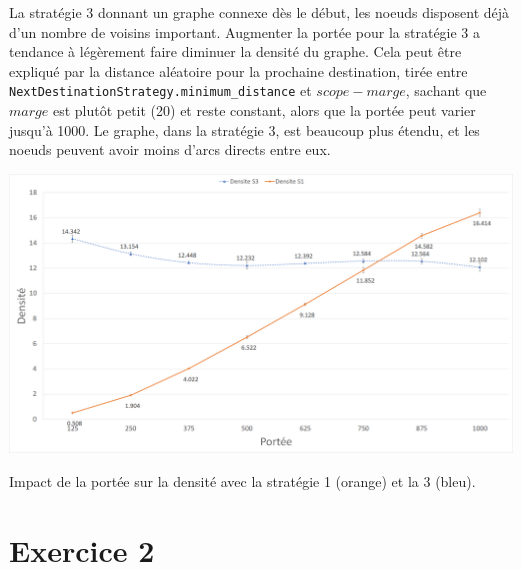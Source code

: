 \documentclass[a4paper]{article}
\begin{document}
La stratégie 3 donnant un graphe connexe dès
le début, les noeuds disposent déjà d'un nombre de voisins important.
Augmenter la portée pour la stratégie 3 a tendance à légèrement faire
diminuer la densité du graphe. Cela peut être expliqué par la distance
aléatoire pour la prochaine destination, tirée entre
\texttt{NextDestinationStrategy.minimum\_distance} et $scope - marge$, sachant
que $marge$ est plutôt petit (20) et reste constant, alors que la
portée peut varier jusqu'à 1000. Le graphe, dans la stratégie 3, est beaucoup
plus étendu, et les noeuds peuvent avoir moins d'arcs directs
entre eux.
\begin{center}
\begin{minipage}[c]{\linewidth}
\includegraphics[width=\textwidth]{images/q10-11-s1and2.png}
\begin{center}
  Impact de la portée sur la densité avec la stratégie 1
  (orange) et la 3 (bleu).
  \end{center}
\end{minipage}
\end{center}

\section{Exercice 2}
\end{document}
